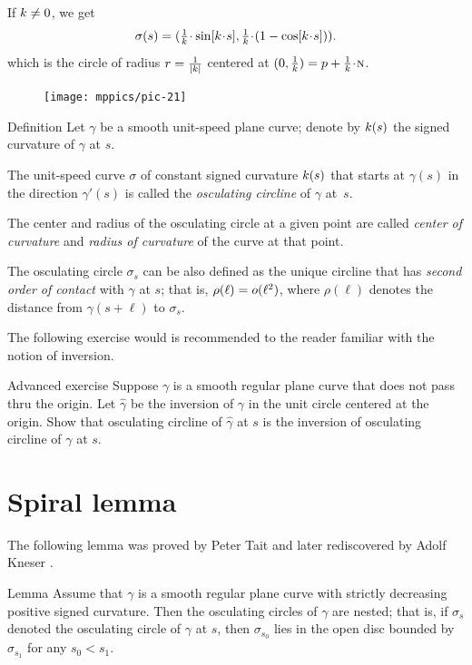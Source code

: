 If $k\ne 0$, we get
\[\sigma(s)=(\tfrac1\skur\cdot\sin[\skur\cdot s],
\tfrac1\skur\cdot(1-\cos[\skur\cdot s])).\]
which is the circle of radius $r=\tfrac1{|k|}$ centered at $(0,\tfrac1\skur)=p+\tfrac1\skur\cdot\norm$.
\qeds


\begin{figure}
\vskip-0mm
\centering
\texttt{[image: mppics/pic-21]}
\vskip0mm
\end{figure}

\begin{thm}{Definition}
Let $\gamma$ be a smooth unit-speed plane curve;
denote by $k(s)$ the signed curvature of $\gamma$ at $s$.

The unit-speed curve $\sigma$ of constant signed curvature $k(s)$ that starts at $\gamma(s)$ in the direction $\gamma'(s)$ is called the \emph{osculating circline} of $\gamma$ at~$s$.

The center and radius of the osculating circle at a given point are called \emph{center of curvature} and \emph{radius of curvature} of the curve at that point.
\end{thm}

The osculating circle $\sigma_s$ can be also defined as the unique circline that has \emph{second order of contact} with $\gamma$ at $s$;
that is, $\rho(\ell)\z=o(\ell^2)$, where $\rho(\ell)$ denotes the distance from $\gamma(s+\ell)$ to $\sigma_s$.

The following exercise would is recommended to the reader familiar with the notion of inversion.

\begin{thm}{Advanced exercise}\label{ex:inverse}
Suppose $\gamma$ is a smooth regular plane curve that does not pass thru the origin.
Let $\hat \gamma$ be the inversion of $\gamma$ in the unit circle centered at the origin.
Show that osculating circline of $\hat\gamma$ at $s$ is the inversion of osculating circline of $\gamma$ at $s$.
\end{thm}

\section*{Spiral lemma}
\label{spiral}

The following lemma was proved by Peter Tait \cite{tait}
and later rediscovered by Adolf Kneser \cite{kneser}.

\begin{thm}{Lemma}\label{lem:spiral}
Assume that $\gamma$ is a smooth regular plane curve with strictly decreasing positive signed curvature. Then the osculating circles of $\gamma$ are nested; that is, if $\sigma_s$ denoted the osculating circle of $\gamma$ at $s$,
then $\sigma_{s_0}$ lies in the open disc bounded by $\sigma_{s_1}$ for any $s_0<s_1$. 
\end{thm}

